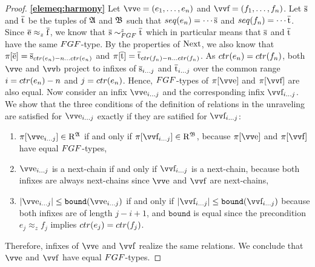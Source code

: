 \begin{proof}\mbox{}

\noindent
\textbf{\ref{elemeq:harmony}}
Let $\elemtuptuplee = (e_{1}, \ldots, e_{n})$ and $\elemtuptuplef = (f_{1}, \ldots, f_{n})$.
Let $\overline{\mathrm{s}}$ and $\overline{\mathrm{t}}$ be the tuples of ${\mathfrak{A}}$ and ${\mathfrak{B}}$ such that $\seq{e_{n}} = \cdots \elemtuples$ and $\seq{f_{n}} = \cdots \elemtuplet$.
Since $\overline{\mathrm{e}} \approx_z \overline{\mathrm{f}}$, we know that $\elemtuples \bisimto_{\FGF}^{z} \elemtuplet$ which in particular means that $\overline{\mathrm{s}}$ and $\overline{\mathrm{t}}$ have the same $\FGF$-type.
By the properties of $\mathrm{Next}$, we also know that $\pi[\elemtuplee] = \elemtuples_{\ctr{e_{n}}-n\ldots{}\ctr{e_{n}}}$ and $\pi[\elemtuplet] = \elemtuplet_{\ctr{f_{n}}-n\ldots{}\ctr{f_{n}}}$.
As $\ctr{e_{n}} = \ctr{f_{n}}$, both $\elemtuptuplee$ and $\elemtuptupleb$ project to infixes of $\overline{\mathrm{s}}_{i\ldots{}j}$ and $\overline{\mathrm{t}}_{i\ldots{}j}$ over the common range $i = \ctr{e_{n}} - n$ and $j = \ctr{e_{n}}$.
Hence, $\FGF$-types of $\pi[\elemtuptuplee]$ and $\pi[\elemtuptuplef]$ are also equal.
Now consider an infix $\elemtuptuplee_{i\ldots{}j}$ and the corresponding infix $\elemtuptuplef_{i\ldots{}j}$.
We show that the three conditions of the definition of relations in the unraveling are satisfied for $\elemtuptuplee_{i\ldots{}j}$ exactly if they are satified for $\elemtuptuplef_{i\ldots{}j}$:
\begin{enumerate}
  \item $\pi[\elemtuptuplee_{i\ldots{}j}] \in \relR^{\str{A}}$ if and only if $\pi[\elemtuptuplef_{i\ldots{}j}] \in \relR^{\str{B}}$, because $\pi[\elemtuptuplee]$ and $\pi[\elemtuptuplef]$ have equal $\FGF$-types,
  \item $\elemtuptuplee_{i\ldots{}j}$ is a next-chain if and only if $\elemtuptuplef_{i\ldots{}j}$ is a next-chain, because both infixes are always next-chains since $\elemtuptuplee$ and $\elemtuptuplef$ are next-chains,
  \item $|\elemtuptuplee_{i\ldots{}j}| \le \mathtt{bound}(\elemtuptuplee_{i\ldots{}j})$ if and only if $|\elemtuptuplef_{i\ldots{}j}| \le \mathtt{bound}(\elemtuptuplef_{i\ldots{}j})$ because both infixes are of length $j-i+1$, and $\mathtt{bound}$ is equal since the precondition $e_{j} \approx_{z} f_{j}$ implies $\ctr{e_{j}} = \ctr{f_{j}}$.
\end{enumerate}
Therefore, infixes of $\elemtuptuplee$ and $\elemtuptuplef$ realize the same relations.
We conclude that $\elemtuptuplee$ and $\elemtuptuplef$ have equal $\FGF$-types.


\end{proof}
